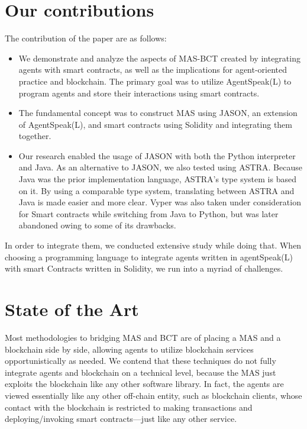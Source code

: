 \section{Our contributions}

The contribution of the paper are as follows:

\begin{itemize}

    \item We demonstrate and analyze the aspects of \ac{MAS}-\ac{BCT} created by integrating agents with smart contracts, as well as the implications for agent-oriented practice and blockchain. The primary goal was to utilize AgentSpeak(L) to program agents and store their interactions using smart contracts.
    
\vspace{.5cm}

    \item  The fundamental concept was to construct \ac{MAS} using JASON, an extension of AgentSpeak(L), and smart contracts using Solidity and integrating them together.
    
\vspace{.5cm}

    \item Our research enabled the usage of JASON with both the Python interpreter and Java. As an alternative to JASON, we also tested using \ac{ASTRA}. Because Java was the prior implementation language, \ac{ASTRA}'s type system is based on it. By using a comparable type system, translating between \ac{ASTRA} and Java is made easier and more clear. Vyper was also taken under consideration for Smart contracts while switching from Java to Python, but was later abandoned owing to some of its drawbacks.
    
\vspace{.5cm}

\end{itemize}

In order to integrate them, we conducted extensive study while doing that. When choosing a programming language to integrate agents written in agentSpeak(L) with smart Contracts written in Solidity, we run into a myriad of challenges.

\section{State of the Art}

Most methodologies to bridging \ac{MAS} and \ac{BCT} are of placing a \ac{MAS} and a blockchain side by side, allowing agents to utilize blockchain services opportunistically as needed. We contend that these techniques do not fully integrate agents and blockchain on a technical level, because the \ac{MAS} just exploits the blockchain like any other software library. In fact, the agents are viewed essentially like any other off-chain entity, such as blockchain clients, whose contact with the blockchain is restricted to making transactions and deploying/invoking smart contracts—just like any other service.

